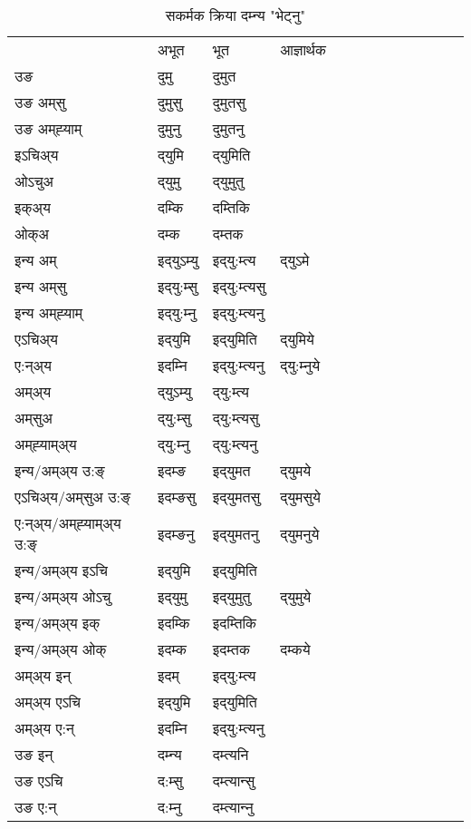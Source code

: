 \begin{table}[H]
\centering
\caption{\label{um.vt} सकर्मक क्रिया  दम्‍न्य  "भेट्नु"  }
\begin{tabular}{l|l|l|l|l|l|l|l|l|l|l|l|l}  \toprule
&अभूत & भूत & आज्ञार्थक \\ 
उङ &दुमु &दुमुत \\ 
उङ अम्‌सु &दुमुसु &दुमुतसु \\ 
उङ अम्‌ह्‍याम् &दुमुनु &दुमुतनु \\ 
इऽचिअ्य &द्‌युमि &द्‌युमिति   \\ 
ओऽचुअ &द्‌युमु &द्‌युमुतु   \\ 
इक्अ्य &दम्कि &दम्तिकि   \\ 
ओक्अ &दम्क &दम्तक   \\ 
इन्य अम् & इद्‌युऽम्यु  & इद्‌यु:म्त्य &द्‌युऽमे  \\ 
इन्य अम्‌सु & इद्‌यु:म्सु  & इद्‌यु:म्त्यसु   \\ 
इन्य अम्‌ह्‍याम् & इद्‌यु:म्‍नु  & इद्‌यु:म्त्यनु   \\ 
एऽचिअ्य & इद्‌युमि & इद्‌युमिति &द्‌युमिये    \\ 
ए:न्अ्य & इदम्‍नि  & इद्‌यु:म्त्यनु &द्‌यु:म्‍नुये  \\ 
अम्अ्य & द्‌युऽम्यु  & द्‌यु:म्त्य  \\ 
अम्‌सुअ & द्‌यु:म्सु & द्‌यु:म्त्यसु  \\ 
अम्‌ह्‍याम्अ्य & द्‌यु:म्‍नु  & द्‌यु:म्त्यनु \\ 
\midrule
इन्य/अम्अ्य उ:ङ्‌&इदम्ङ & इद्‌युमत &द्‌युमये \\ 
एऽचिअ्य/अम्‌सुअ उ:ङ्‌ &इदम्ङसु & इद्‌युमतसु &द्‌युमसुये \\ 
ए:न्अ्य/अम्‌ह्‍याम्अ्य उ:ङ्‌ &इदम्ङनु & इद्‌युमतनु &द्‌युमनुये \\ 
इन्य/अम्अ्य इऽचि & इद्‌युमि & इद्‌युमिति    \\ 
इन्य/अम्अ्य ओऽचु & इद्‌युमु & इद्‌युमुतु  &द्‌युमुये  \\ 
इन्य/अम्अ्य इक् & इदम्कि & इदम्तिकि   \\ 
इन्य/अम्अ्य ओक् & इदम्क & इदम्तक  &दम्कये  \\ 
अम्अ्य इन् & इदम् & इद्‌यु:म्त्य   \\ 
अम्अ्य एऽचि & इद्‌युमि & इद्‌युमिति    \\ 
अम्अ्य ए:न् & इदम्‍नि  & इद्‌यु:म्त्यनु  \\ 
\midrule
उङ इन् & दम्‍न्य  & दम्त्यनि  \\ 
उङ एऽचि & द:म्सु  & दम्त्यान्सु   \\ 
उङ ए:न्& द:म्‍नु  & दम्त्यान्‍नु   \\ 
\bottomrule
\end{tabular}
\end{table}


